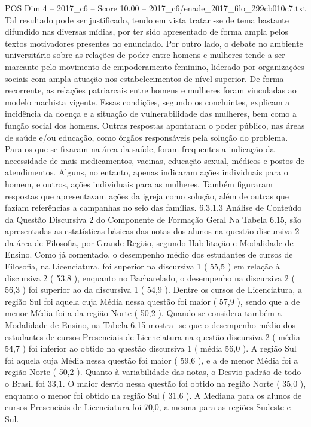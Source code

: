 \begin{textsample}{POS Dim 4 – 2017\_c6 – Score 10.00 – 2017\_c6/enade\_2017\_filo\_299cb010c7.txt}
Tal resultado pode ser justificado, tendo em vista tratar -se de tema bastante difundido nas diversas mídias, por ter sido apresentado de forma ampla pelos textos motivadores presentes no enunciado.
Por outro lado, o debate no ambiente universitário sobre as relações de poder entre homens e mulheres tende a ser marcante pelo movimento de empoderamento feminino, liderado por organizações sociais com ampla atuação nos estabelecimentos de nível superior.
De forma recorrente, as relações patriarcais entre homens e mulheres foram vinculadas ao modelo machista vigente.
Essas condições, segundo os concluintes, explicam a incidência da doença e a situação de vulnerabilidade das mulheres, bem como a função social dos homens.
Outras respostas apontaram o poder público, nas áreas de saúde e/ou educação, como órgãos responsáveis pela solução do problema.
Para os que se fixaram na área da saúde, foram frequentes a indicação da necessidade de mais medicamentos, vacinas, educação sexual, médicos e postos de atendimentos.
Alguns, no entanto, apenas indicaram ações individuais para o homem, e outros, ações individuais para as mulheres.
Também figuraram respostas que apresentavam ações da igreja como solução, além de outras que faziam referências a campanhas no seio das famílias. 6.3.1.3 Análise de Conteúdo da Questão Discursiva 2 do Componente de Formação Geral Na Tabela 6.15, são apresentadas as estatísticas básicas das notas dos alunos na questão discursiva 2 da área de Filosofia, por Grande Região, segundo Habilitação e Modalidade de Ensino.
Como já comentado, o desempenho médio dos estudantes de cursos de Filosofia, na Licenciatura, foi superior na discursiva 1 ( 55,5 ) em relação à discursiva 2 ( 53,8 ), enquanto no Bacharelado, o desempenho na discursiva 2 ( 56,3 ) foi superior ao da discursiva 1 ( 54,9 ).
Dentre os cursos de Licenciatura, a região Sul foi aquela cuja Média nessa questão foi maior ( 57,9 ), sendo que a de menor Média foi a da região Norte ( 50,2 ).
Quando se considera também a Modalidade de Ensino, na Tabela 6.15 mostra -se que o desempenho médio dos estudantes de cursos Presenciais de Licenciatura na questão discursiva 2 ( média 54,7 ) foi inferior ao obtido na questão discursiva 1 ( média 56,0 ).
A região Sul foi aquela cuja Média nessa questão foi maior ( 59,6 ), e a de menor Média foi a região Norte ( 50,2 ).
Quanto à variabilidade das notas, o Desvio padrão de todo o Brasil foi 33,1.
O maior desvio nessa questão foi obtido na região Norte ( 35,0 ), enquanto o menor foi obtido na região Sul ( 31,6 ).
A Mediana para os alunos de cursos Presenciais de Licenciatura foi 70,0, a mesma para as regiões Sudeste e Sul.

\end{textsample}
